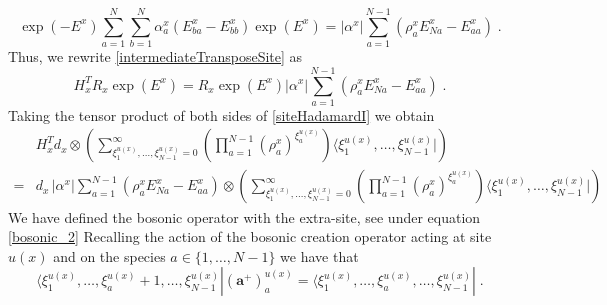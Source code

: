 \documentclass[10pt]{article}
\numberwithin{equation}{section}
\numberwithin{equation}{subsection}
\newcommand{\dt}{\;.}
\begin{document}
\begin{equation}\label{HadTransfBoundary}
\exp{(-E^{x})}\sum_{a=1}^{N}\sum_{b=1}^{N}\alpha_{a}^{x}\left(E_{b a}^{x}-E_{bb}^{x}\right)\exp{(E^{x})}=	|\alpha^{x}|\sum_{a=1}^{N-1}\left(\rho_{a}^{x}E_{Na}^{x}-E_{aa}^{x}\right)\dt
\end{equation}
Thus, we rewrite \eqref{intermediateTransposeSite} as
\begin{equation}\label{siteHadamardI}
H_{x}^{T}R_{x}\exp{(E^{x})}=R_{x}\exp{(E^{x})}|\alpha^{x}|\sum_{a=1}^{N-1}\left(\rho_{a}^{x}E_{Na}^{x}-E_{aa}^{x}\right)\dt
\end{equation}
Taking the tensor product of both sides of \eqref{siteHadamardI}%
we obtain 
\begin{equation}\label{siteHadamardII}
    \begin{split}
    	&H_{x}^{T}d_{x}\otimes\left(\sum_{\xi_{1}^{u(x)},\ldots,\xi_{N-1}^{u(x)}=0}^{\infty}\left(\prod_{a=1}^{N-1}\left(\rho_{a}^{x}\right)^{\xi_{a}^{u(x)}}\right)\langle \xi_{1}^{u(x)},\ldots,\xi_{N-1}^{u(x)}|\right)\\=&
 d_{x}\,
|\alpha^{x}|\sum_{a=1}^{N-1}\left(\rho_{a}^{x}E_{Na}^{x}-E_{aa}^{x}\right)\otimes \left(\sum_{\xi_{1}^{u(x)},\ldots,\xi_{N-1}^{u(x)}=0}^{\infty}\left(\prod_{a=1}^{N-1}\left(\rho_{a}^{x}\right)^{\xi_{a}^{u(x)}}\right)\langle \xi_{1}^{u(x)},\ldots,\xi_{N-1}^{u(x)}|\right)
    \end{split}
\end{equation}
 {\color{blue} We have defined the bosonic operator with the extra-site, see under equation \eqref{bosonic_2}}
Recalling the action of the bosonic creation operator acting at site $u(x)$ and on the species $a\in \{1,\ldots,N-1\}$ we have that 
\begin{equation}\label{bosonicKX}
    \langle \xi_{1}^{u(x)},\ldots,\xi_{a}^{u(x)}+1,\ldots,\xi_{N-1}^{u(x)}|(\mathbf{a}^{+})^{u(x)}_{a}=  \langle \xi_{1}^{u(x)},\ldots,\xi_{a}^{u(x)},\ldots,\xi_{N-1}^{u(x)}|\dt
\end{equation}
\end{document}
